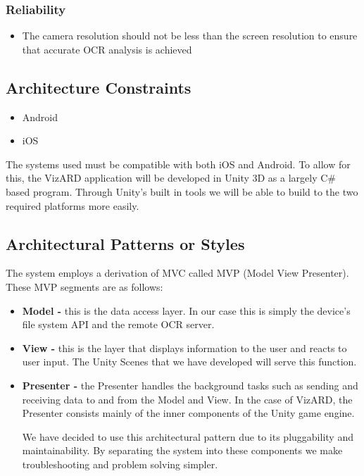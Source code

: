 \documentclass[a4paper,12pt]{article}
\begin{document}
\subsubsection*{Reliability}	
\begin{itemize}		
	\item The camera resolution should not be less than the screen resolution to ensure that accurate OCR analysis is achieved
\end{itemize}

\subsection{Architecture Constraints}
\begin{itemize}
	\item Android
	\item iOS
\end{itemize}
The systems used must be compatible with both iOS and Android.
\newline
To allow for this, the VizARD application will be developed in Unity 3D as a largely C\# based program. Through Unity's built in tools we will be able to build to the two required platforms more easily. 

\subsection{Architectural Patterns or Styles}
The system employs a derivation of MVC called MVP (Model View Presenter).
These MVP segments are as follows:
\begin{itemize}
	\item \textbf{Model -} this is the data access layer. In our case this is simply the device's file system API and the remote OCR server.
	\item\textbf{View -} this is the layer that displays information to the user and reacts to user input. The Unity Scenes that we have developed will serve this function.
	\item \textbf{Presenter -} the Presenter handles the background tasks such as sending and receiving data to and from the Model and View. In the case of VizARD, the Presenter consists mainly of the inner components of the Unity game engine.
	

We have decided to use this architectural pattern due to its pluggability and maintainability. By separating the system into these components we make troubleshooting and problem solving simpler.
\end{itemize}
\end{document}
